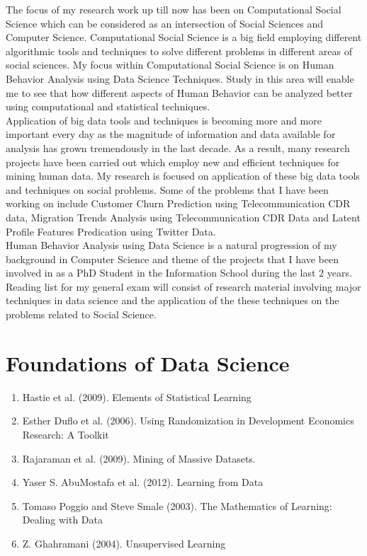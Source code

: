 
The focus of my research work up till now has been on Computational Social Science which can be considered as an intersection of Social Sciences and Computer Science. Computational Social Science is a big field employing different algorithmic tools and techniques to solve different problems in different areas of social sciences. My focus within Computational Social Science is on Human Behavior Analysis using Data Science Techniques. Study in this area will enable me to see that how different aspects of Human Behavior can be analyzed better using computational and statistical techniques.\\

Application of big data tools and techniques is becoming more and more important every day as the magnitude of information and data available for analysis has grown tremendously in the last decade. As a result, many research projects have been carried out which employ new and efficient techniques for mining human data. My research is focused on application of these big data tools and techniques on social problems. Some of the problems that I have been working on include Customer Churn Prediction using Telecommunication CDR data, Migration Trends Analysis using Telecommunication CDR Data and Latent Profile Features Predication using Twitter Data.\\ 

Human Behavior Analysis using Data Science is a natural progression of my background in Computer Science and theme of the projects that I have been involved in as a PhD Student in the Information School during the last 2 years.   Reading list for my general exam will consist of research material involving major techniques in data science and the application of the these techniques on the problems related to Social Science. 
\\

\section{Foundations of Data Science}
\begin{enumerate}   
\item  Hastie et al. (2009). Elements of Statistical Learning \cite{StatisticalLearning_2009}  
\item  Esther Duflo et al. (2006). Using Randomization in Development Economics Research: A Toolkit \cite{Duflo}   
\item  Rajaraman et al. (2009). Mining of Massive Datasets. \cite{Rajaraman_2009}  
\item  Yaser S. AbuMostafa et al. (2012). Learning from Data \cite{Abu-Mostafa:2012:LD:2207825}  
\item  Tomaso Poggio and Steve Smale (2003).  The Mathematics of Learning: Dealing with Data\cite{Poggio_2005} 
\item  Z. Ghahramani (2004).  Unsupervised Learning \cite{Ghahramani_2004}

\end{enumerate}  
\\
